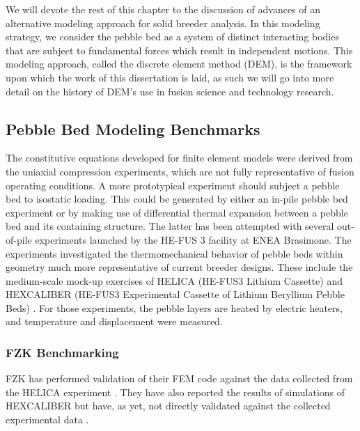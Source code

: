 We will devote the rest of this chapter to the discussion of advances of an alternative modeling approach for solid breeder analysis. In this modeling strategy, we consider the pebble bed as a system of distinct interacting bodies that are subject to fundamental forces which result in independent motions. This modeling approach, called the discrete element method (DEM), is the framework upon which the work of this dissertation is laid, as such we will go into more detail on the history of DEM's use in fusion science and technology research.






\subsection{Pebble Bed Modeling Benchmarks}

The constitutive equations developed for finite element models were derived from the uniaxial compression experiments, which are not fully representative of fusion operating conditions. A more prototypical experiment should subject a pebble bed to isostatic loading. This could be generated by either an in-pile pebble bed experiment or by making use of differential thermal expansion between a pebble bed and its containing structure. The latter has been attempted with several out-of-pile experiments launched by the HE-FUS 3 facility at ENEA Brasimone. The experiments investigated the thermomechanical behavior of pebble beds within geometry much more representative of current breeder designs. These include the medium-scale mock-up exercises of HELICA (HE-FUS3 Lithium Cassette) and HEXCALIBER (HE-FUS3 Experimental Cassette of Lithium Beryllium Pebble Beds) \cite{dellorco:2006,DiMaio20081287}. For those experiments, the pebble layers are heated by electric heaters, and temperature and displacement were measured.

\subsubsection{FZK Benchmarking}
FZK has performed validation of their FEM code against the data collected from the HELICA experiment \cite{Gan:2008kx}. They have also reported the results of simulations of HEXCALIBER but have, as yet, not directly validated against the collected experimental data \cite{Gan:2009vn}.

